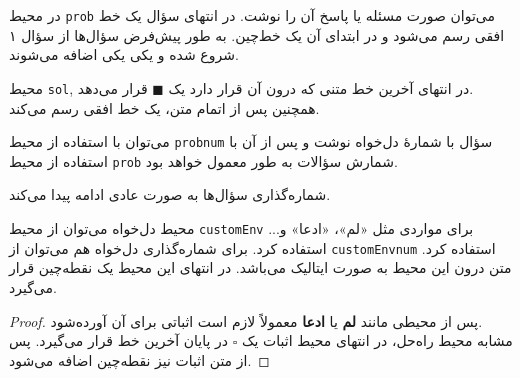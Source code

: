 \begin{prob}
	در محیط
	\texttt{prob}
	می‌توان صورت مسئله یا پاسخ آن را نوشت.  در انتهای سؤال یک خط افقی رسم می‌شود و در ابتدای آن یک خط‌چین. به طور پیش‌فرض سؤال‌ها از سؤال ۱ شروع شده و یکی یکی اضافه می‌شوند.
	
\end{prob}
\begin{sol}
	محیط
	\texttt{sol},
	در انتهای آخرین خط متنی که درون آن قرار دارد یک 
	$ \blacksquare $
	قرار می‌دهد.\\	
	همچنین پس از اتمام متن، یک خط افقی رسم می‌کند.
\end{sol}
\begin{probnum}{10}
	می‌توان با استفاده از محیط
	\texttt{probnum}
	سؤال با شمارهٔ دل‌خواه نوشت و پس از آن با استفاده از محیط 
	\texttt{prob}
	شمارش سؤالات به طور معمول خواهد بود.
	
\end{probnum}

\begin{prob}
	شماره‌گذاری سؤال‌ها به صورت عادی ادامه پیدا می‌کند.
	
\end{prob}
\begin{customEnv}{محیط دل‌خواه}
	می‌توان از محیط
	\texttt{customEnv}
	برای مواردی مثل «لم»، «ادعا» و... استفاده کرد. برای شماره‌گذاری دل‌خواه هم می‌توان از
	\texttt{customEnvnum}
	استفاده کرد. متن درون این محیط به صورت ایتالیک می‌باشد. در انتهای این محیط یک نقطه‌چین قرار می‌گیرد.
\end{customEnv}
\begin{proof}
	پس از محیطی مانند
	\textbf{لم}
	یا
	\textbf{ادعا}
	معمولاً لازم است اثباتی برای آن آورده‌شود.\\
	مشابه محیط راه‌حل، در انتهای محیط اثبات یک 
	$\square$
	در پایان آخرین خط قرار می‌گیرد. پس از متن اثبات نیز نقطه‌چین اضافه می‌شود.
\end{proof}